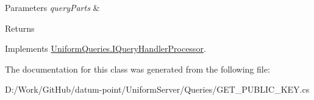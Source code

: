 \begin{DoxyParams}{Parameters}
{\em query\+Parts} & \\
\hline
\end{DoxyParams}
\begin{DoxyReturn}{Returns}

\end{DoxyReturn}


Implements \mbox{\hyperlink{interface_uniform_queries_1_1_i_query_handler_processor_a0edbfe93aab9f1787e4dc0311f7695c7}{Uniform\+Queries.\+I\+Query\+Handler\+Processor}}.



The documentation for this class was generated from the following file\+:\begin{DoxyCompactItemize}
\item 
D\+:/\+Work/\+Git\+Hub/datum-\/point/\+Uniform\+Server/\+Queries/G\+E\+T\+\_\+\+P\+U\+B\+L\+I\+C\+\_\+\+K\+E\+Y.\+cs\end{DoxyCompactItemize}
